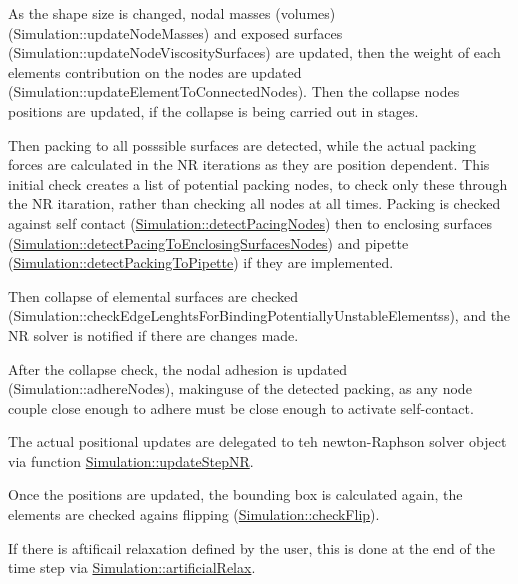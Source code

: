 As the shape size is changed, nodal masses (volumes) (Simulation\+::update\+Node\+Masses) and exposed surfaces (Simulation\+::update\+Node\+Viscosity\+Surfaces) are updated, then the weight of each elements contribution on the nodes are updated (Simulation\+::update\+Element\+To\+Connected\+Nodes). Then the collapse nodes positions are updated, if the collapse is being carried out in stages. ~\newline


Then packing to all posssible surfaces are detected, while the actual packing forces are calculated in the N\+R iterations as they are position dependent. This initial check creates a list of potential packing nodes, to check only these through the N\+R itaration, rather than checking all nodes at all times. Packing is checked against self contact (\hyperlink{classSimulation_ab67230d22a5c07292574d10d5ee8fc13}{Simulation\+::detect\+Pacing\+Nodes}) then to enclosing surfaces (\hyperlink{classSimulation_ac1225a76f3acef7e6ecc175d386b6b86}{Simulation\+::detect\+Pacing\+To\+Enclosing\+Surfaces\+Nodes}) and pipette (\hyperlink{classSimulation_a97927bd45513fc16d7dd56b9e8474f4a}{Simulation\+::detect\+Packing\+To\+Pipette}) if they are implemented. ~\newline


Then collapse of elemental surfaces are checked (Simulation\+::check\+Edge\+Lenghts\+For\+Binding\+Potentially\+Unstable\+Elementss), and the N\+R solver is notified if there are changes made.

After the collapse check, the nodal adhesion is updated (Simulation\+::adhere\+Nodes), makinguse of the detected packing, as any node couple close enough to adhere must be close enough to activate self-\/contact. ~\newline


The actual positional updates are delegated to teh newton-\/\+Raphson solver object via function \hyperlink{classSimulation_a6a869cb433953d1d36249460b0a74545}{Simulation\+::update\+Step\+N\+R}. ~\newline


Once the positions are updated, the bounding box is calculated again, the elements are checked agains flipping (\hyperlink{classSimulation_a7aa2db4c2819e37c0ded181d47467233}{Simulation\+::check\+Flip}).

If there is aftificail relaxation defined by the user, this is done at the end of the time step via \hyperlink{classSimulation_aee92b20e497b42f5b7a089c3f9409e97}{Simulation\+::artificial\+Relax}.

